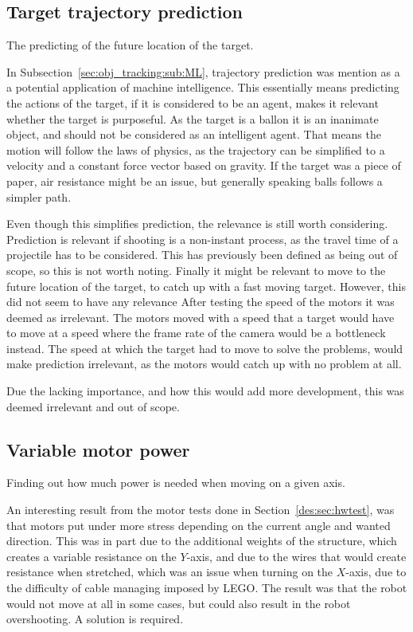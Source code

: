 \subsection{Target trajectory prediction}
The predicting of the future location of the target.


In Subsection~\ref{sec:obj_tracking:sub:ML}, trajectory prediction was mention as a  a potential application of machine intelligence.
This essentially means predicting the actions of the target, if it is considered to be an agent, makes it relevant whether the target is purposeful.
As the target is a ballon it is an inanimate object, and should not be considered as an intelligent agent.
That means the motion will follow the laws of physics, as the trajectory can be simplified to a velocity and a constant force vector based on gravity.
If the target was a piece of paper, air resistance might be an issue, but generally speaking balls follows a simpler path.

Even though this simplifies prediction, the relevance is still worth considering.
Prediction is relevant if shooting is a non-instant process, as the travel time of a projectile has to be considered.
This has previously been defined as being out of scope, so this is not worth noting.
Finally it might be relevant to move to the future location of the target, to catch up with a fast moving target.
However, this did not seem to have any relevance 
After testing the speed of the motors it was deemed as irrelevant.
The motors moved with a speed that a target would have to move at a speed where the frame rate of the camera would be a bottleneck instead.
The speed at which the target had to move to solve the problems, would make prediction irrelevant, as the motors would catch up with no problem at all.


Due the lacking importance, and how this would add more development, this was deemed irrelevant and out of scope.

\subsection{Variable motor power}
Finding out how much power is needed when moving on a given axis.


An interesting result from the motor tests done in Section~\ref{des:sec:hwtest}, was that motors put under more stress depending on the current angle and wanted direction.
This was in part due to the additional weights of the structure, which creates a variable resistance on the $Y$-axis, and due to the wires that would create resistance when stretched, which was an issue when turning on the $X$-axis, due to the difficulty of cable managing imposed by LEGO.
The result was that the robot would not move at all in some cases, but could also result in the robot overshooting.
A solution is required.

